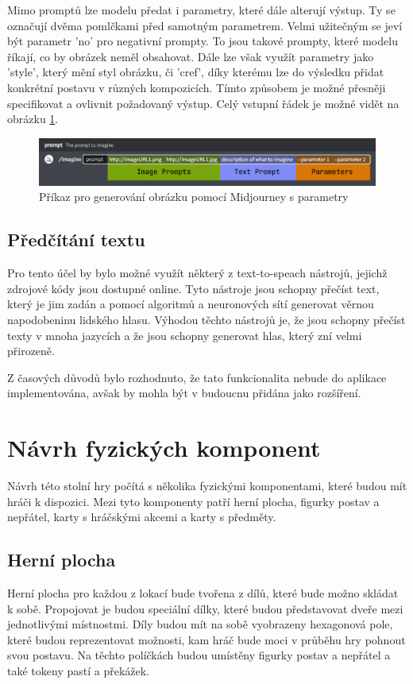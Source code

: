 Mimo promptů lze modelu předat i parametry, které dále alterují výstup. Ty se označují dvěma pomlčkami před samotným parametrem. Velmi užitečným se jeví být parametr 'no' pro negativní prompty. To jsou takové prompty, které modelu říkají, co by obrázek neměl obsahovat. Dále lze však využít parametry jako 'style', který mění styl obrázku, či 'cref', díky kterému lze do výsledku přidat konkrétní postavu v různých kompozicích. Tímto způsobem je možné přesněji specifikovat a ovlivnit požadovaný výstup. Celý vstupní řádek je možné vidět na obrázku \ref{fig:mj_prompts_params}.

\begin{figure}[H]
    \centering
    \includegraphics[width=1\textwidth]{resources/figures/midjourney_prompts_params.png}
    \caption{Příkaz pro generování obrázku pomocí Midjourney s parametry\cite{midjourney}}
    \label{fig:mj_prompts_params}
\end{figure}

\subsection{Předčítání textu}
Pro tento účel by bylo možné využít některý z text-to-speach nástrojů, jejichž zdrojové kódy jsou dostupné online. Tyto nástroje jsou schopny přečíst text, který je jim zadán a pomocí algoritmů a neuronových sítí generovat věrnou napodobeninu lidského hlasu. Výhodou těchto nástrojů je, že jsou schopny přečíst texty v mnoha jazycích a že jsou schopny generovat hlas, který zní velmi přirozeně.

Z časových důvodů bylo rozhodnuto, že tato funkcionalita nebude do aplikace implementována, avšak by mohla být v budoucnu přidána jako rozšíření.

\section{Návrh fyzických komponent}
Návrh této stolní hry počítá s několika fyzickými komponentami, které budou mít hráči k dispozici. Mezi tyto komponenty patří herní plocha, figurky postav a nepřátel, karty s hráčskými akcemi a karty s předměty.

\subsection{Herní plocha}
Herní plocha pro každou z lokací bude tvořena z dílů, které bude možno skládat k sobě. Propojovat je budou speciální dílky, které budou představovat dveře mezi jednotlivými místnostmi. Díly budou mít na sobě vyobrazeny hexagonová pole, které budou reprezentovat možnosti, kam hráč bude moci v průběhu hry pohnout svou postavu. Na těchto políčkách budou umístěny figurky postav a nepřátel a také tokeny pastí a překážek.

